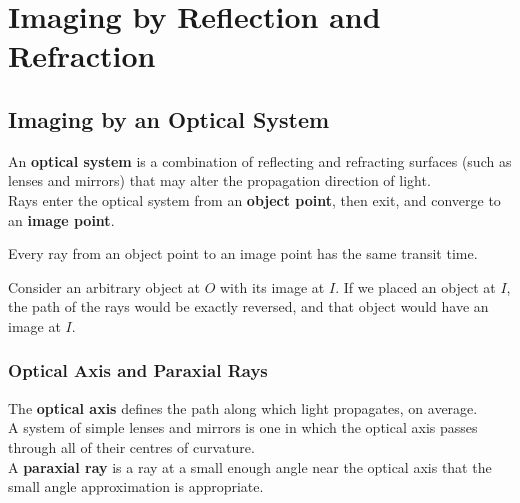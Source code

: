 \chapter{Imaging by Reflection and Refraction}


\section{Imaging by an Optical System}

\begin{definition}
    An \textbf{optical system} is a combination of reflecting and refracting surfaces (such as lenses and mirrors) that may alter the propagation direction of light. \\
    Rays enter the optical system from an \textbf{object point}, then exit, and converge to an \textbf{image point}.
\end{definition}

\begin{proposition}
    Every ray from an object point to an image point has the same transit time.
\end{proposition}

\begin{theorem}
    Consider an arbitrary object at $O$ with its image at $I$. If we placed an object at $I$, the path of the rays would be exactly reversed, and that object would have an image at $I$.
\end{theorem}

\subsection{Optical Axis and Paraxial Rays}

\begin{definition}
    The \textbf{optical axis} defines the path along which light propagates, on average. \\
    A system of simple lenses and mirrors is one in which the optical axis passes through all of their centres of curvature. \\
    A \textbf{paraxial ray} is a ray at a small enough angle near the optical axis that the small angle approximation is appropriate.
\end{definition}

